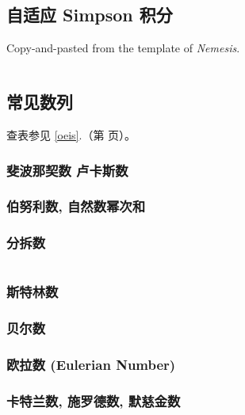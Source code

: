 \documentclass[a4paper, twoside]{article}
\begin{document}
\begin{multicols}{2}
			\subsection{自适应 Simpson 积分}
				Copy-and-pasted from the template of \textit{Nemesis}.
				\inputminted{cpp}{../src/math/simpson.cpp}

			\subsection{常见数列}
				查表参见 \ref{oeis}.（第 \pageref{oeis} 页）。

				\subsubsection{斐波那契数 卢卡斯数}
					

				\subsubsection{伯努利数, 自然数幂次和}
					\label{bernoulli}
					
				
				\subsubsection{分拆数}
					\inputminted{cpp}{../src/math/分拆数.cpp}
				
				\subsubsection{斯特林数}
					
				
				\subsubsection{贝尔数}
					
				
				\subsubsection{欧拉数 (Eulerian Number)}
					
				
				\subsubsection{卡特兰数, 施罗德数, 默慈金数}
					\label{catalan}
					
			

\end{multicols}
\end{document}
